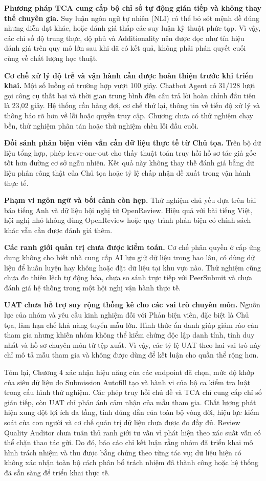 \textbf{Phương pháp TCA cung cấp bộ chỉ số tự động gián tiếp và không thay thế chuyên gia.} Suy luận ngôn ngữ tự nhiên (NLI) có thể bỏ sót mệnh đề đúng nhưng diễn đạt khác, hoặc đánh giá thấp các suy luận kỹ thuật phức tạp. Vì vậy, các chỉ số độ trung thực, độ phủ và Additionality nên được đọc như tín hiệu đánh giá trên quy mô lớn sau khi đã có kết quả, không phải phán quyết cuối cùng về chất lượng học thuật.

\textbf{Cơ chế xử lý độ trễ và vận hành cần được hoàn thiện trước khi triển khai.} Một số luồng có trường hợp vượt 100 giây. Chatbot Agent có 31/128 lượt gọi công cụ thất bại và thời gian trung bình đến câu trả lời hoàn chỉnh đầu tiên là 23,02 giây. Hệ thống cần hàng đợi, cơ chế thử lại, thông tin về tiến độ xử lý và thông báo rõ hơn về lỗi hoặc quyền truy cập. Chương chưa có thử nghiệm chạy bền, thử nghiệm phân tán hoặc thử nghiệm chèn lỗi đầu cuối.

\textbf{Đối sánh phản biện viên vẫn cần dữ liệu thực tế từ Chủ tọa.} Trên bộ dữ liệu tổng hợp, phép leave-one-out cho thấy thuật toán truy hồi hồ sơ tác giả gốc tốt hơn đường cơ sở ngẫu nhiên. Kết quả này không thay thế đánh giá bằng dữ liệu phân công thật của Chủ tọa hoặc tỷ lệ chấp nhận đề xuất trong vận hành thực tế.

\textbf{Phạm vi ngôn ngữ và bối cảnh còn hẹp.} Thử nghiệm chủ yếu dựa trên bài báo tiếng Anh và dữ liệu hội nghị từ OpenReview. Hiệu quả với bài tiếng Việt, hội nghị nhỏ không dùng OpenReview hoặc quy trình phản biện có chính sách khác vẫn cần được đánh giá thêm.

\textbf{Các ranh giới quản trị chưa được kiểm toán.} Cơ chế phân quyền ở cấp ứng dụng không cho biết nhà cung cấp AI lưu giữ dữ liệu trong bao lâu, có dùng dữ liệu để huấn luyện hay không hoặc đặt dữ liệu tại khu vực nào. Thử nghiệm cũng chưa đo thiên lệch tự động hóa, chưa so sánh trực tiếp với PeerSubmit và chưa đánh giá hệ thống trong một hội nghị vận hành thực tế.

\textbf{UAT chưa hỗ trợ suy rộng thống kê cho các vai trò chuyên môn.} Nguồn lực của nhóm và yêu cầu kinh nghiệm đối với Phản biện viên, đặc biệt là Chủ tọa, làm hạn chế khả năng tuyển mẫu lớn. Hình thức ẩn danh giúp giảm rào cản tham gia nhưng khiến nhóm không thể kiểm chứng độc lập danh tính, tính duy nhất và hồ sơ chuyên môn từ tệp xuất. Vì vậy, các tỷ lệ UAT theo hai vai trò này chỉ mô tả mẫu tham gia và không được dùng để kết luận cho quần thể rộng hơn.

Tóm lại, Chương 4 xác nhận hiệu năng của các endpoint đã chọn, mức độ khớp của siêu dữ liệu do Submission Autofill tạo và hành vi của bộ ca kiểm tra luật trong cấu hình thử nghiệm. Các phép truy hồi chủ đề và TCA chỉ cung cấp chỉ số gián tiếp, còn UAT chỉ phản ánh cảm nhận của mẫu tham gia. Chất lượng phát hiện xung đột lợi ích đa tầng, tính đúng đắn của toàn bộ vòng đời, hiệu lực kiểm soát của con người và cơ chế quản trị dữ liệu chưa được đo đầy đủ. Review Quality Auditor chưa tuân thủ ranh giới tư vấn vì phát hiện theo xác suất vẫn có thể chặn thao tác gửi. Do đó, báo cáo chỉ kết luận rằng nhóm đã triển khai mô hình trách nhiệm và thu được bằng chứng theo từng tác vụ; dữ liệu hiện có không xác nhận toàn bộ cách phân bổ trách nhiệm đã thành công hoặc hệ thống đã sẵn sàng để triển khai thực tế.